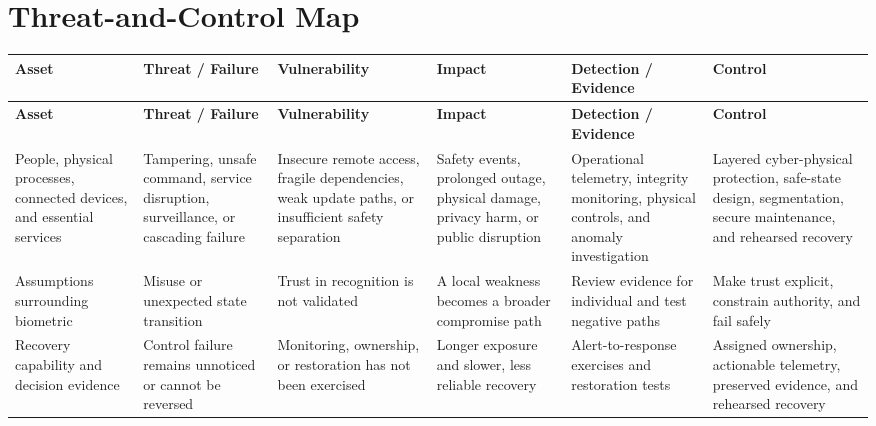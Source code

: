 \documentclass[11pt]{article}
\begin{document}
\section*{Threat-and-Control Map}
\begingroup\scriptsize\setlength{\tabcolsep}{2pt}
\begin{longtable}{>{\RaggedRight\arraybackslash}p{}>{\RaggedRight\arraybackslash}p{}>{\RaggedRight\arraybackslash}p{}>{\RaggedRight\arraybackslash}p{}>{\RaggedRight\arraybackslash}p{}>{\RaggedRight\arraybackslash}p{}}
\toprule\rowcolor{Navy}\color{white}\textbf{Asset} & \color{white}\textbf{Threat / Failure} & \color{white}\textbf{Vulnerability} & \color{white}\textbf{Impact} & \color{white}\textbf{Detection / Evidence} & \color{white}\textbf{Control}\\\midrule
\endfirsthead
\toprule\rowcolor{Navy}\color{white}\textbf{Asset} & \color{white}\textbf{Threat / Failure} & \color{white}\textbf{Vulnerability} & \color{white}\textbf{Impact} & \color{white}\textbf{Detection / Evidence} & \color{white}\textbf{Control}\\\midrule
\endhead
People, physical processes, connected devices, and essential services & Tampering, unsafe command, service disruption, surveillance, or cascading failure & Insecure remote access, fragile dependencies, weak update paths, or insufficient safety separation & Safety events, prolonged outage, physical damage, privacy harm, or public disruption & Operational telemetry, integrity monitoring, physical controls, and anomaly investigation & Layered cyber-physical protection, safe-state design, segmentation, secure maintenance, and rehearsed recovery\\\midrule
Assumptions surrounding biometric & Misuse or unexpected state transition & Trust in recognition is not validated & A local weakness becomes a broader compromise path & Review evidence for individual and test negative paths & Make trust explicit, constrain authority, and fail safely\\\midrule
Recovery capability and decision evidence & Control failure remains unnoticed or cannot be reversed & Monitoring, ownership, or restoration has not been exercised & Longer exposure and slower, less reliable recovery & Alert-to-response exercises and restoration tests & Assigned ownership, actionable telemetry, preserved evidence, and rehearsed recovery\\\midrule
\bottomrule
\end{longtable}
\endgroup
\end{document}
